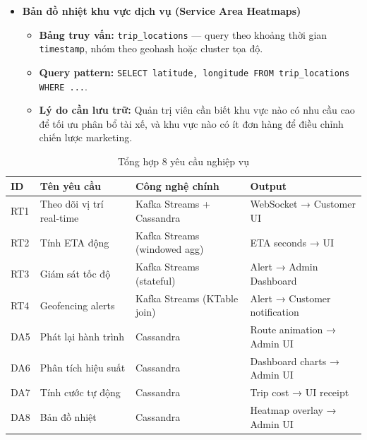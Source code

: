 \begin{itemize}
\item \textbf{Bản đồ nhiệt khu vực dịch vụ (Service Area Heatmaps)}
\begin{itemize}
    \item \textbf{Bảng truy vấn:} \texttt{trip\_locations} — query theo khoảng thời gian \texttt{timestamp}, nhóm theo geohash hoặc cluster tọa độ.
    \item \textbf{Query pattern:} \texttt{SELECT latitude, longitude FROM trip\_locations WHERE ...}.
    \item \textbf{Lý do cần lưu trữ:} Quản trị viên cần biết khu vực nào có nhu cầu cao để tối ưu phân bổ tài xế, và khu vực nào có ít đơn hàng để điều chỉnh chiến lược marketing.
\end{itemize}

\end{itemize}

\bigskip
\begin{table}[H]
\centering
\caption{Tổng hợp 8 yêu cầu nghiệp vụ}
\label{tab:requirements-summary}
\begin{tabular}{|p{1.5cm}|p{4cm}|p{3.5cm}|p{3.5cm}|}
\hline
\textbf{ID} & \textbf{Tên yêu cầu} & \textbf{Công nghệ chính} & \textbf{Output} \\
\hline
RT1 & Theo dõi vị trí real-time & Kafka Streams + Cassandra & WebSocket → Customer UI \\
\hline
RT2 & Tính ETA động & Kafka Streams (windowed agg) & ETA seconds → UI \\
\hline
RT3 & Giám sát tốc độ & Kafka Streams (stateful) & Alert → Admin Dashboard \\
\hline
RT4 & Geofencing alerts & Kafka Streams (KTable join) & Alert → Customer notification \\
\hline
DA5 & Phát lại hành trình & Cassandra & Route animation → Admin UI \\
\hline
DA6 & Phân tích hiệu suất & Cassandra & Dashboard charts → Admin UI \\
\hline
DA7 & Tính cước tự động & Cassandra & Trip cost → UI receipt \\
\hline
DA8 & Bản đồ nhiệt & Cassandra & Heatmap overlay → Admin UI \\
\hline
\end{tabular}
\end{table}
